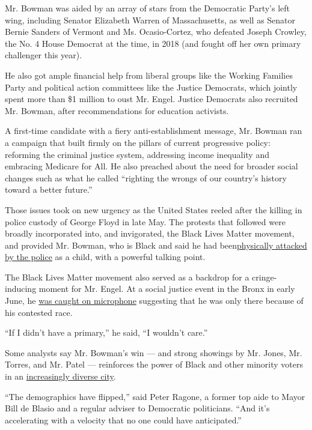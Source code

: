 Mr. Bowman was aided by an array of stars from the Democratic Party's
left wing, including Senator Elizabeth Warren of Massachusetts, as well
as Senator Bernie Sanders of Vermont and Ms. Ocasio-Cortez, who defeated
Joseph Crowley, the No. 4 House Democrat at the time, in 2018 (and
fought off her own primary challenger this year).

He also got ample financial help from liberal groups like the Working
Families Party and political action committees like the Justice
Democrats, which jointly spent more than \$1 million to oust Mr. Engel.
Justice Democrats also recruited Mr. Bowman, after recommendations for
education activists.

A first-time candidate with a fiery anti-establishment message, Mr.
Bowman ran a campaign that built firmly on the pillars of current
progressive policy: reforming the criminal justice system, addressing
income inequality and embracing Medicare for All. He also preached about
the need for broader social changes such as what he called ``righting
the wrongs of our country's history toward a better future.''

Those issues took on new urgency as the United States reeled after the
killing in police custody of George Floyd in late May. The protests that
followed were broadly incorporated into, and invigorated, the Black
Lives Matter movement, and provided Mr. Bowman, who is Black and said he
had
been\href{https://twitter.com/jamaalbowmanny/status/1267979573200932865}{physically
attacked by the police} as a child, with a powerful talking point.

The Black Lives Matter movement also served as a backdrop for a
cringe-inducing moment for Mr. Engel. At a social justice event in the
Bronx in early June, he
\href{https://twitter.com/emilyngo/status/1267873270218600448}{was
caught on microphone} suggesting that he was only there because of his
contested race.

``If I didn't have a primary,'' he said, ``I wouldn't care.''

Some analysts say Mr. Bowman's win --- and strong showings by Mr. Jones,
Mr. Torres, and Mr. Patel --- reinforces the power of Black and other
minority voters in an
\href{https://www.census.gov/quickfacts/newyorkcitynewyork}{increasingly
diverse city}.

``The demographics have flipped,'' said Peter Ragone, a former top aide
to Mayor Bill de Blasio and a regular adviser to Democratic politicians.
``And it's accelerating with a velocity that no one could have
anticipated.''

